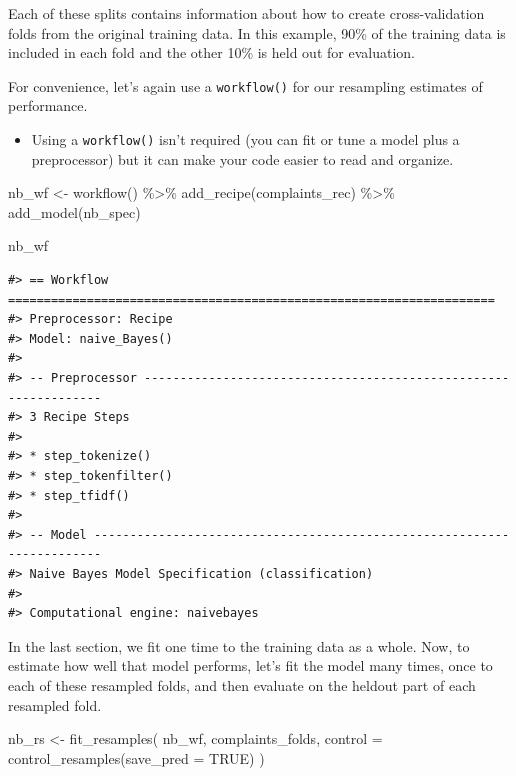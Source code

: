 \documentclass[
]{krantz}
\makeatletter
\newenvironment{Shaded}{\begin{snugshade}}{\end{snugshade}}
\newcommand{\AttributeTok}[1]{\textcolor[rgb]{0.77,0.63,0.00}{#1}}
\newcommand{\ConstantTok}[1]{\textcolor[rgb]{0.00,0.00,0.00}{#1}}
\newcommand{\FunctionTok}[1]{\textcolor[rgb]{0.00,0.00,0.00}{#1}}
\newcommand{\NormalTok}[1]{#1}
\newcommand{\OtherTok}[1]{\textcolor[rgb]{0.56,0.35,0.01}{#1}}
\newcommand{\SpecialCharTok}[1]{\textcolor[rgb]{0.00,0.00,0.00}{#1}}
\newenvironment{kframe}{%
\medskip{}
\setlength{\fboxsep}{.8em}
 \def\at@end@of@kframe{}%
 \ifinner\ifhmode%
  \def\at@end@of@kframe{\end{minipage}}%
  \begin{minipage}{\columnwidth}%
 \fi\fi%
 \def\FrameCommand##1{\hskip\@totalleftmargin \hskip-\fboxsep
 \colorbox{shadecolor}{##1}\hskip-\fboxsep
     \hskip-\linewidth \hskip-\@totalleftmargin \hskip\columnwidth}%
 \MakeFramed {\advance\hsize-\width
   \@totalleftmargin\z@ \linewidth\hsize
   \@setminipage}}%
 {\par\unskip\endMakeFramed%
 \at@end@of@kframe}
\renewenvironment{Shaded}{\begin{kframe}}{\end{kframe}}
\newenvironment{rmdblock}[1]
  {\begin{shaded*}
  \begin{itemize}[left = -1cm, labelsep = 1cm]
  \renewcommand{\labelitemi}{
    \raisebox{-.7\height}[0pt][0pt]{
      {\setkeys{Gin}{width=3em,keepaspectratio}\texttt{[image: images/\#1]}}
    }
  }
 
  \item
  }
  {
  \end{itemize}
  \end{shaded*}
  }
\newenvironment{rmdwarning}
  {\begin{rmdblock}{warning}}
  {\end{rmdblock}}
\makeatother
\begin{document}
Each of these splits contains information about how to create cross-validation folds from the original training data. In this example, 90\% of the training data is included in each fold and the other 10\% is held out for evaluation.

For convenience, let's again use a \texttt{workflow()} for our resampling estimates of performance.

\begin{rmdwarning}
Using a \texttt{workflow()} isn't required (you can fit or tune a model
plus a preprocessor) but it can make your code easier to read and
organize.
\end{rmdwarning}

\begin{Shaded}
\begin{Highlighting}[]
\NormalTok{nb\_wf }\OtherTok{\textless{}{-}} \FunctionTok{workflow}\NormalTok{() }\SpecialCharTok{\%\textgreater{}\%}
  \FunctionTok{add\_recipe}\NormalTok{(complaints\_rec) }\SpecialCharTok{\%\textgreater{}\%}
  \FunctionTok{add\_model}\NormalTok{(nb\_spec)}

\NormalTok{nb\_wf}
\end{Highlighting}
\end{Shaded}

\begin{verbatim}
#> == Workflow ====================================================================
#> Preprocessor: Recipe
#> Model: naive_Bayes()
#> 
#> -- Preprocessor ----------------------------------------------------------------
#> 3 Recipe Steps
#> 
#> * step_tokenize()
#> * step_tokenfilter()
#> * step_tfidf()
#> 
#> -- Model -----------------------------------------------------------------------
#> Naive Bayes Model Specification (classification)
#> 
#> Computational engine: naivebayes
\end{verbatim}

In the last section, we fit one time to the training data as a whole. Now, to estimate how well that model performs, let's fit the model many times, once to each of these resampled folds, and then evaluate on the heldout part of each resampled fold.

\begin{Shaded}
\begin{Highlighting}[]
\NormalTok{nb\_rs }\OtherTok{\textless{}{-}} \FunctionTok{fit\_resamples}\NormalTok{(}
\NormalTok{  nb\_wf,}
\NormalTok{  complaints\_folds,}
  \AttributeTok{control =} \FunctionTok{control\_resamples}\NormalTok{(}\AttributeTok{save\_pred =} \ConstantTok{TRUE}\NormalTok{)}
\NormalTok{)}
\end{Highlighting}
\end{Shaded}
\end{document}
